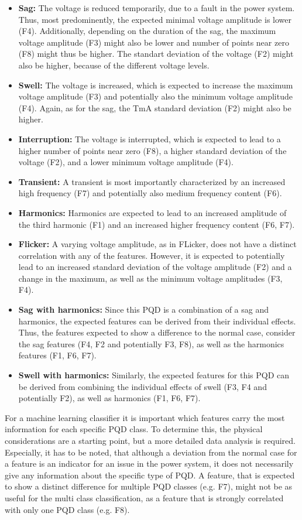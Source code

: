 \begin{itemize}
    \item \textbf{Sag:} The voltage is reduced temporarily, due to a fault in the power system. Thus, most predominently, the expected minimal voltage amplitude is lower (F4). Additionally, depending on the duration of the sag, the maximum voltage amplitude (F3) might also be lower and number of points near zero (F8) might thus be higher. The standart deviation of the voltage (F2) might also be higher, because of the different voltage levels.
    \item \textbf{Swell:} The voltage is increased, which is expected to increase the maximum voltage amplitude (F3) and potentially also the minimum voltage amplitude (F4). Again, as for the sag, the TmA standard deviation (F2) might also be higher.
    \item \textbf{Interruption:} The voltage is interrupted, which is expected to lead to a higher number of points near zero (F8), a higher standard deviation of the voltage (F2), and a lower minimum voltage amplitude (F4). 
    \item \textbf{Transient:} A transient is most importantly characterized by an increased high frequency (F7) and potentially also medium frequency content (F6). 
    \item \textbf{Harmonics:} Harmonics are expected to lead to an increased amplitude of the third harmonic (F1) and an increased higher frequency content (F6, F7).
    \item \textbf{Flicker:} A varying voltage amplitude, as in FLicker, does not have a distinct correlation with any of the features. However, it is expected to potentially lead to an increased standard deviation of the voltage amplitude (F2) and a change in the maximum, as well as the minimum voltage amplitudes (F3, F4).
    \item \textbf{Sag with harmonics:} Since this PQD is a combination of a sag and harmonics, the expected features can be derived from their individual effects. Thus, the features expected to show a difference to the normal case, consider the sag features (F4, F2 and potentially F3, F8), as well as the harmonics features (F1, F6, F7).
    \item \textbf{Swell with harmonics:} Similarly, the expected features for this PQD can be derived from combining the individual effects of swell (F3, F4 and potentially F2), as well as harmonics (F1, F6, F7).
\end{itemize}
For a machine learning classifier it is important which features carry the most information for each specific PQD class. To determine this, the physical considerations are a starting point, but a more detailed data analysis is required. Especially, it has to be noted, that although a deviation from the normal case for a feature is an indicator for an issue in the power system, it does not necessarily give any information about the specific type of PQD. A feature, that is expected to show a distinct difference for multiple PQD classes (e.g. F7), might not be as useful for the multi class classification, as a feature that is strongly correlated with only one PQD class (e.g. F8).
